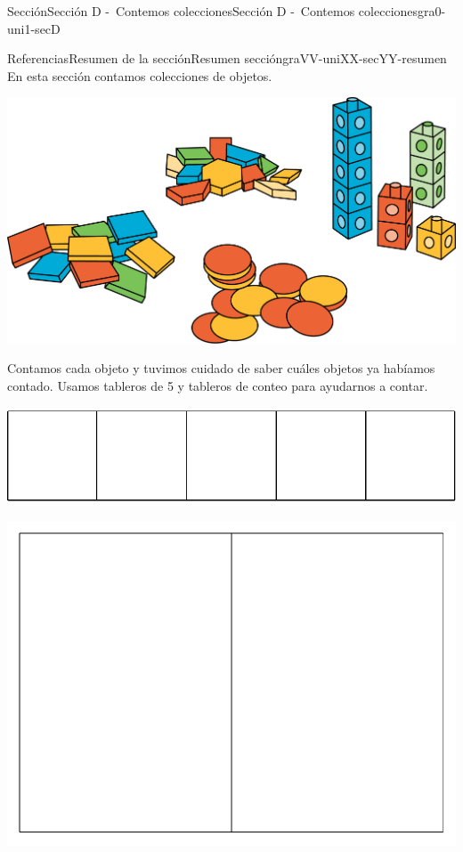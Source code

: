 \documentclass[twoside,10pt,]{article}
\begin{document}
\begin{sectionptx}{Sección}{Sección D -~Contemos colecciones}{}{Sección D -~Contemos colecciones}{}{}{gra0-uni1-secD}
\begin{references-subsection}{Referencias}{Resumen de la sección}{}{Resumen sección}{}{}{graVV-uniXX-secYY-resumen}
En esta sección contamos colecciones de objetos.%
\begin{image}{0.3}{0.4}{0.3}{}%
\includegraphics[width=\linewidth]{external/png-source/math-toys.png}
\end{image}%
Contamos cada objeto y tuvimos cuidado de saber cuáles objetos ya habíamos contado. Usamos tableros de 5 y tableros de conteo para ayudarnos a contar.%
\begin{sidebyside}{2}{0}{0}{0}%
\begin{sbspanel}{0.4}%
\includegraphics[width=\linewidth]{external/svg-source/tikz-file-148144.pdf}
\end{sbspanel}%
\begin{sbspanel}{0.6}%
\includegraphics[width=\linewidth]{external/svg-source/tikz-file-147784.pdf}

\end{sbspanel}
\end{sidebyside}
\end{references-subsection}
\end{sectionptx}
\end{document}

